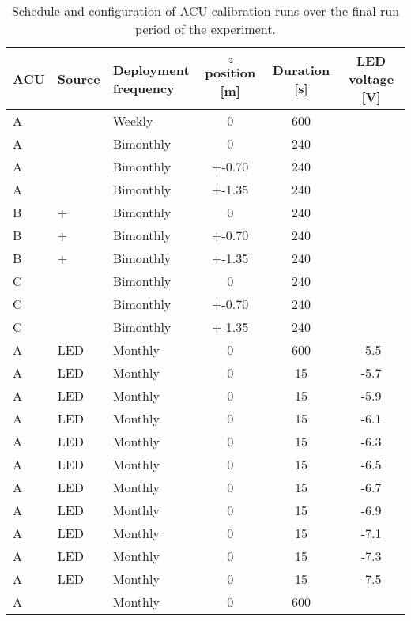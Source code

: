 \begin{table}[ht]
    \centering
    \footnotesize
    \begin{tabular}[t]{lllSSS}
        \toprule
        ACU & Source & \parbox[b]{2.1cm}{Deployment\\frequency} & {$z$ position [m]} &
        {Duration [s]} & {LED voltage [V]} \\
        \midrule
        A &  & Weekly & 0 & 600 & \\
        \midrule
        A &  & Bimonthly & 0 & 240 & \\
        A &  & Bimonthly & +-0.70 & 240 & \\
        A &  & Bimonthly & +-1.35 & 240 & \\
        B & \amc{} +  & Bimonthly & 0 & 240 & \\
        B & \amc{} +  & Bimonthly & +-0.70 & 240 & \\
        B & \amc{} +  & Bimonthly & +-1.35 & 240 & \\
        C &  & Bimonthly & 0 & 240 & \\
        C &  & Bimonthly & +-0.70 & 240 & \\
        C &  & Bimonthly & +-1.35 & 240 & \\
        \midrule
        A & LED & Monthly & 0 & 600 & -5.5 \\
        A & LED & Monthly & 0 & 15 & -5.7 \\
        A & LED & Monthly & 0 & 15 & -5.9 \\
        A & LED & Monthly & 0 & 15 & -6.1 \\
        A & LED & Monthly & 0 & 15 & -6.3 \\
        A & LED & Monthly & 0 & 15 & -6.5 \\
        A & LED & Monthly & 0 & 15 & -6.7 \\
        A & LED & Monthly & 0 & 15 & -6.9 \\
        A & LED & Monthly & 0 & 15 & -7.1 \\
        A & LED & Monthly & 0 & 15 & -7.3 \\
        A & LED & Monthly & 0 & 15 & -7.5 \\
        A &  & Monthly & 0 & 600 \\
        \bottomrule
    \end{tabular}
    \caption[Automated calibration schedule]{
        Schedule and configuration of ACU calibration runs
        over the final run period of the experiment.
    }
    \label{tab:calib_sched}
\end{table}

